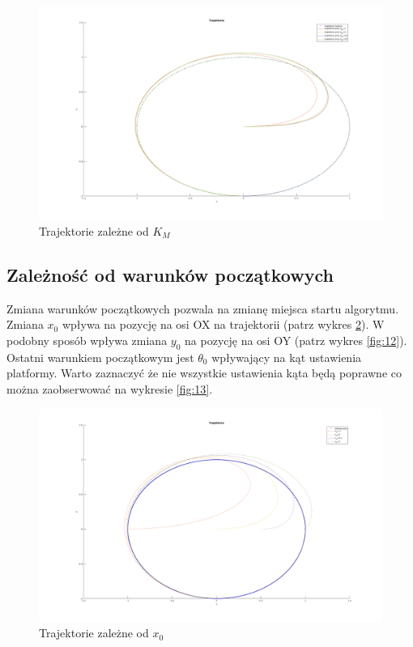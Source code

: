\documentclass[12pt,a4paper]{article}
\begin{document}
  \begin{figure}[H]
    \centering
    \includegraphics[width=1\textwidth]{figures/dyn_trajektoria_km.png}
    \caption{Trajektorie zależne od $K_M$}
    \label{fig:10}
  \end{figure}



  \subsection{Zależność od warunków początkowych}
  Zmiana warunków początkowych pozwala na zmianę miejsca startu algorytmu. Zmiana $x_0$ wpływa na pozycję na osi OX na trajektorii (patrz wykres \ref{fig:11}). W podobny sposób wpływa zmiana $y_0$ na pozycję na osi OY (patrz wykres \ref{fig:12}). Ostatni warunkiem początkowym jest $\theta_0$ wpływający na kąt ustawienia platformy. Warto zaznaczyć że nie wszystkie ustawienia kąta będą poprawne co można zaobserwować na wykresie \ref{fig:13}.

  \begin{figure}[H]
    \centering
    \includegraphics[width=1\textwidth]{figures/wp_x.png}
    \caption{Trajektorie zależne od $x_0$}
    \label{fig:11}
  \end{figure}
\end{document}

